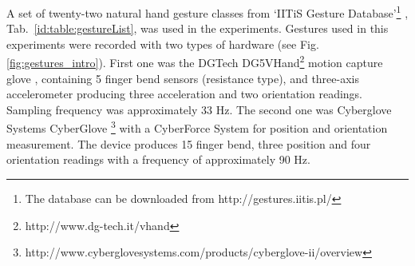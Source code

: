 \documentclass[]{article}
\begin{document}
A set of twenty-two natural hand gesture classes from `IITiS Gesture
Database'\footnote{The database can be downloaded from
http://gestures.iitis.pl/} \cite{Glomb:2011},
Tab.~\ref{id:table:gestureList}, was used in the experiments. Gestures used in
this experiments were recorded with two types of hardware (see Fig.
\ref{fig:gestures_intro}). First one was the DGTech 
DG5VHand\texttrademark{}\footnote{http://www.dg-tech.it/vhand} motion capture 
glove \cite{DG5VHand}, containing 5 finger bend sensors (resistance type),
and  three-axis accelerometer producing three acceleration and two orientation 
readings. Sampling frequency was approximately 33 Hz. The second one was
Cyberglove Systems CyberGlove\texttrademark{} 
\footnote{http://www.cyberglovesystems.com/products/cyberglove-ii/overview} 
with a CyberForce\texttrademark{} System for position and  orientation
measurement. The device produces 15 finger bend, three position  and four
orientation readings with a frequency of approximately 90 Hz.
\end{document}
